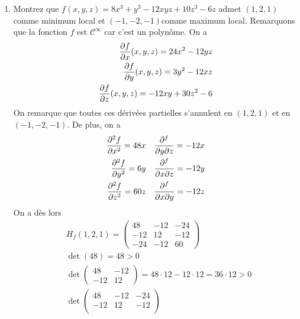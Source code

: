 \begin{enumerate}
\begin{align*}
\begin{pmatrix}
            2 & 0 \\
            0 & -2
        \end{pmatrix}
        \end{align*}
        Cette matrice n'est ni semi-défini positif si semi-défini négatif car 
        $\det(H_f(x,y)) = -4 < 0$ On en déduit que $(0,0)$ est un col.
        \item Montrez que $f(x,y,z) = 8x^3 + y^3 - 12 xyz  + 10z^3 - 6z$
        admet $(1,2,1)$ comme minimum local et $(-1,-2,-1)$comme maximum local. Remarquons que la fonction $f$ est $\mathcal{ C}^\infty$ car c'est un polynôme.
        On a \begin{align*}
        \frac{\partial f}{\partial x}(x,y,z) = 24 x^2 - 12 yz \\
        \frac{\partial f}{\partial y}(x,y,z) = 3y^2 - 12 xz \\
        \frac{\partial f}{\partial z}(x,y,z) = -12xy +30z^2-6    
        \end{align*}
        On remarque que toutes ces dérivées partielles s'annulent en $(1,2,1)$ et en $(-1,-2,-1)$. De plus, on a 
        \begin{align*}
            \frac{\partial ^2f}{\partial x^2} = 48x\quad&\frac{\partial ^f}{\partial y\partial z} = -12 x\\
            \frac{\partial ^2f}{\partial y^2} = 6y\quad&\frac{\partial ^f}{\partial x\partial z} = -12 y \\
            \frac{\partial ^2f}{\partial z^2} = 60z \quad&\frac{\partial ^f}{\partial x\partial y} = -12 z\\
        \end{align*}
        On a dès lors
        \begin{align*}
            &H_f(1,2,1) = \begin{pmatrix}
                48 & -12 & -24 \\
                -12 & 12 & -12 \\
                -24 & -12 & 60
            \end{pmatrix}\\
            &\det(48) = 48>0\\
            &\det\begin{pmatrix}
                48 & -12\\ -12 & 12
            \end{pmatrix} =48\cdot 12-12\cdot 12 = 36\cdot 12 >0\\
            &\det\begin{pmatrix}
                48 & -12 & -24 \\
                -12 & 12 & -12 \\

\end{pmatrix}
\end{align*}
\end{enumerate}
